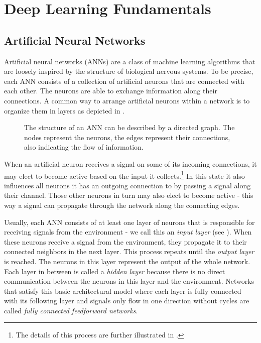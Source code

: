 \chapter{Deep Learning Fundamentals}

\section{Artificial Neural Networks}

Artificial neural networks (ANNs) are a class of machine learning algorithms
that are loosely inspired by the structure of biological nervous
systems.
To be precise, each ANN consists of a collection of artificial neurons
that are connected with each other. The neurons are able to exchange
information along their connections.
A common way to arrange artificial neurons within a network is to organize
them in layers as depicted in .
\begin{figure}[h]
  \centering
  \resizebox{0.75\textwidth}{!}{}
  \caption{The structure of an ANN can be described by a
    directed graph. The nodes represent the
    neurons, the edges represent their connections, also indicating
    the flow of information.}
  \label{fig:basic-network}
\end{figure}

When an artificial neuron receives a signal on some of its
incoming connections, it may elect to become active based on the input
it collects.\footnote{The
  details of this
  process are further illustrated in .}
In this state it also influences all neurons it has an outgoing
connection to by passing a signal along their
channel. Those other neurons in turn may also elect to become
active - this way a signal can propagate through the network along
the connecting edges.

Usually, each ANN consists of at least one layer of neurons that is
responsible for receiving signals from the environment - we call this
an \textit{input layer} (see ). When these neurons
receive a signal from the environment, they propagate it to their
connected neighbors in the next layer. This process repeats until the
\textit{output layer} is reached. The neurons in this layer represent the
output of the whole network. Each layer in between is called a \textit{hidden
layer} because there is no direct communication between the neurons in
this layer and the environment. Networks that satisfy this basic
architectural model where each layer is fully connected with its
following layer and signals only flow in one direction without cycles
are called
\textit{fully connected feedforward networks}.

